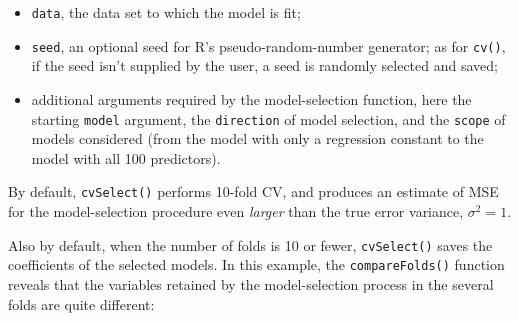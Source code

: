 \documentclass[
]{jss}
\providecommand{\tightlist}{%
  \setlength{\itemsep}{0pt}\setlength{\parskip}{0pt}}
\begin{document}
\begin{itemize}
\tightlist
\item
  \texttt{data}, the data set to which the model is fit;
\item
  \texttt{seed}, an optional seed for R's pseudo-random-number
  generator; as for \texttt{cv()}, if the seed isn't supplied by the
  user, a seed is randomly selected and saved;
\item
  additional arguments required by the model-selection function, here
  the starting \texttt{model} argument, the \texttt{direction} of model
  selection, and the \texttt{scope} of models considered (from the model
  with only a regression constant to the model with all 100 predictors).
\end{itemize}

By default, \texttt{cvSelect()} performs 10-fold CV, and produces an
estimate of MSE for the model-selection procedure even \emph{larger}
than the true error variance, \(\sigma^2 = 1\).

Also by default, when the number of folds is 10 or fewer,
\texttt{cvSelect()} saves the coefficients of the selected models. In
this example, the \texttt{compareFolds()} function reveals that the
variables retained by the model-selection process in the several folds
are quite different:
\end{document}
